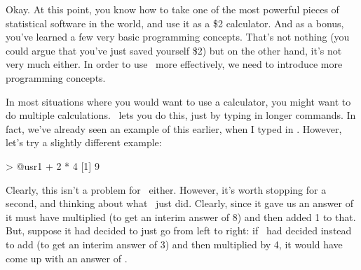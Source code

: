 
Okay. At this point, you know how to take one of the most powerful pieces of statistical software in the world, and use it as a \$2 calculator. And as a bonus, you've learned a few very basic programming concepts. That's not nothing (you could argue that you've just saved yourself \$2) but on the other hand, it's not very much either. In order to use \R\ more effectively, we need to introduce more programming concepts.

In most situations where you would want to use a calculator, you might want to do multiple calculations. \R\ lets you do this, just by typing in longer commands.  In fact, we've already seen an example of this earlier, when I typed in . However, let's try a slightly different example:
\begin{rblock1}
> @usr{1 + 2 * 4}
[1] 9
\end{rblock1}
Clearly, this isn't a problem for \R\ either. However, it's worth stopping for a second, and thinking about what \R\ just did. Clearly, since it gave us an answer of  it must have multiplied  (to get an interim answer of 8) and then added 1 to that. But, suppose it had decided to just go from left to right: if \R\ had decided instead to add  (to get an interim answer of 3) and then multiplied by 4, it would have come up with an answer of . 

